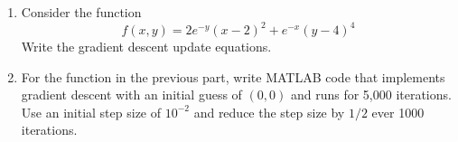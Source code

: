 \documentclass[letterpaper, 11pt]{article}
\begin{document}
\begin{enumerate}
\begin{enumerate}[label=(\alph*)]
\item Consider the function 
\[ f(x,y) = 2e^{-y}(x - 2)^2 + e^{-x}(y - 4)^4 \]
Write the gradient descent update equations. 

\item For the function in the previous part, write MATLAB code that implements gradient descent with an initial guess of $(0,0)$ and runs for 5,000 iterations. Use an initial step size of $10^{-2}$ and reduce the step size by $1/2$ ever 1000 iterations. 


\end{enumerate}


\end{enumerate}
\end{document}
